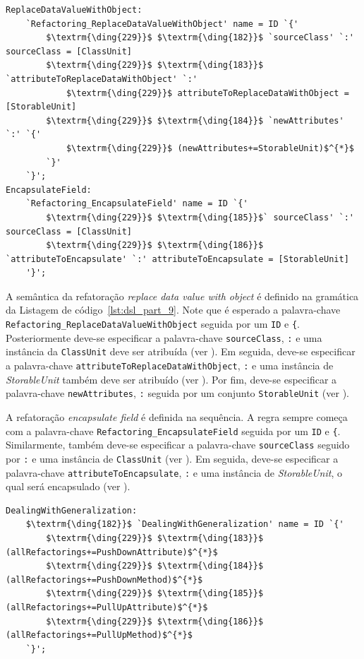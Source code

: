 \begin{lstlisting}[language=Xtext, frame=single, basicstyle=\scriptsize, mathescape=true, label={lst:dsl_part_9}, caption={Gramática da DSL - parte 9}]
ReplaceDataValueWithObject: 
	`Refactoring_ReplaceDataValueWithObject' name = ID `{'
		$\textrm{\ding{229}}$ $\textrm{\ding{182}}$ `sourceClass' `:' sourceClass = [ClassUnit]
		$\textrm{\ding{229}}$ $\textrm{\ding{183}}$ `attributeToReplaceDataWithObject' `:' 
			$\textrm{\ding{229}}$ attributeToReplaceDataWithObject = [StorableUnit]
		$\textrm{\ding{229}}$ $\textrm{\ding{184}}$ `newAttributes' `:' `{'
			$\textrm{\ding{229}}$ (newAttributes+=StorableUnit)$^{*}$
		`}'
	`}';
EncapsulateField: 
	`Refactoring_EncapsulateField' name = ID `{'
		$\textrm{\ding{229}}$ $\textrm{\ding{185}}$` sourceClass' `:' sourceClass = [ClassUnit]
		$\textrm{\ding{229}}$ $\textrm{\ding{186}}$ `attributeToEncapsulate' `:' attributeToEncapsulate = [StorableUnit]
	'}';
\end{lstlisting}

A semântica da refatoração \textit{replace data value with object} é definido na gramática da Listagem de código~\ref{lst:dsl_part_9}. Note que é esperado a palavra-chave \texttt{Refactoring\_ReplaceDataValueWithObject} seguida por um \texttt{ID} e \texttt{\{}. Posteriormente deve-se especificar a palavra-chave \texttt{sourceClass}, \texttt{:} e uma instância da \texttt{ClassUnit} deve ser atribuída (ver ). Em seguida, deve-se especificar a palavra-chave \texttt{attributeToReplaceDataWithObject},  \texttt{:} e uma instância de \textit{StorableUnit} também deve ser atribuído (ver ). Por fim, deve-se especificar a palavra-chave \texttt{newAttributes}, \texttt{:} seguida por um conjunto \texttt{StorableUnit} (ver ).

A refatoração \textit{ encapsulate field} é definida na sequência. A regra sempre começa com a palavra-chave \texttt{Refactoring\_EncapsulateField} seguida por um \texttt{ID} e \texttt{\{}. Similarmente, também deve-se especificar a palavra-chave \texttt{sourceClass} seguido por \texttt{:} e uma instância de \texttt{ClassUnit} (ver ). Em seguida, deve-se especificar a palavra-chave \texttt{attributeToEncapsulate},  \texttt{:} e uma instância de \textit{StorableUnit}, o qual será encapsulado (ver ).

\begin{lstlisting}[language=Xtext, frame=single, basicstyle=\scriptsize, mathescape=true, label={lst:dsl_part_10}, caption={Gramática da DSL - parte 10}]
DealingWithGeneralization: 
	$\textrm{\ding{182}}$ `DealingWithGeneralization' name = ID `{'
		$\textrm{\ding{229}}$ $\textrm{\ding{183}}$ (allRefactorings+=PushDownAttribute)$^{*}$
		$\textrm{\ding{229}}$ $\textrm{\ding{184}}$ (allRefactorings+=PushDownMethod)$^{*}$
		$\textrm{\ding{229}}$ $\textrm{\ding{185}}$ (allRefactorings+=PullUpAttribute)$^{*}$
		$\textrm{\ding{229}}$ $\textrm{\ding{186}}$ (allRefactorings+=PullUpMethod)$^{*}$
	`}';
\end{lstlisting}

